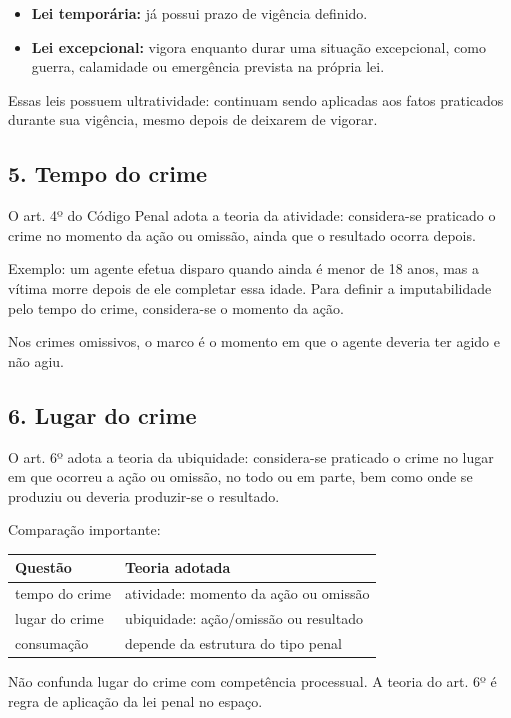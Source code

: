 \documentclass[11pt,a4paper]{article}
\begin{document}
\begin{itemize}
  \item \textbf{Lei temporária:} já possui prazo de vigência definido.
  \item \textbf{Lei excepcional:} vigora enquanto durar uma situação excepcional, como guerra, calamidade ou emergência prevista na própria lei.
\end{itemize}

Essas leis possuem ultratividade: continuam sendo aplicadas aos fatos praticados durante sua vigência, mesmo depois de deixarem de vigorar.

\subsection*{5. Tempo do crime}

O art. 4º do Código Penal adota a teoria da atividade: considera-se praticado o crime no momento da ação ou omissão, ainda que o resultado ocorra depois.

Exemplo: um agente efetua disparo quando ainda é menor de 18 anos, mas a vítima morre depois de ele completar essa idade. Para definir a imputabilidade pelo tempo do crime, considera-se o momento da ação.

Nos crimes omissivos, o marco é o momento em que o agente deveria ter agido e não agiu.

\subsection*{6. Lugar do crime}

O art. 6º adota a teoria da ubiquidade: considera-se praticado o crime no lugar em que ocorreu a ação ou omissão, no todo ou em parte, bem como onde se produziu ou deveria produzir-se o resultado.

Comparação importante:

\begin{tabularx}{\linewidth}{lX}
\toprule
 \textbf{Questão} & \textbf{Teoria adotada} \\
\midrule
 tempo do crime & atividade: momento da ação ou omissão \\
 lugar do crime & ubiquidade: ação/omissão ou resultado \\
 consumação & depende da estrutura do tipo penal \\
\bottomrule
\end{tabularx}


Não confunda lugar do crime com competência processual. A teoria do art. 6º é regra de aplicação da lei penal no espaço.
\end{document}
